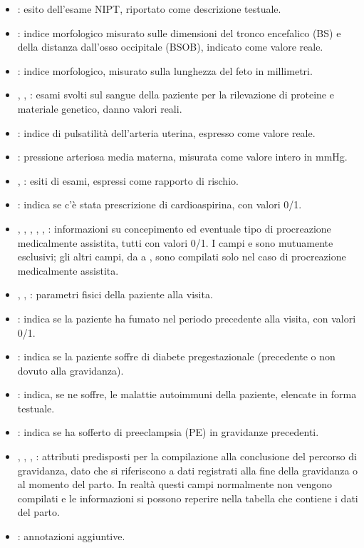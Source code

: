 \begin{itemize}
\item {}: esito dell'esame NIPT, riportato come descrizione testuale.
\item {}: indice morfologico misurato sulle dimensioni del tronco encefalico (BS) e della distanza dall'osso occipitale (BSOB), indicato come valore reale.
\item {}: indice morfologico, misurato sulla lunghezza del feto in millimetri.
\item {}, , : esami svolti sul sangue della paziente per la rilevazione di proteine e materiale genetico, danno valori reali.
\item {}: indice di pulsatilità dell'arteria uterina, espresso come valore reale.
\item {}: pressione arteriosa media materna, misurata come valore intero in mmHg.
\item {}, : esiti di esami, espressi come rapporto di rischio.
\item {}: indica se c'è stata prescrizione di cardioaspirina, con valori 0/1.
\item {}, , , , , : informazioni su concepimento ed eventuale tipo di procreazione medicalmente assistita, tutti con valori 0/1.
I campi  e  sono mutuamente esclusivi; gli altri campi, da  a , sono compilati solo nel caso di procreazione medicalmente assistita.
\item {}, , : parametri fisici della paziente alla visita.
\item {}: indica se la paziente ha fumato nel periodo precedente alla visita, con valori 0/1.
\item {}: indica se la paziente soffre di diabete pregestazionale (precedente o non dovuto alla gravidanza).
\item {}: indica, se ne soffre, le malattie autoimmuni della paziente, elencate in forma testuale.
\item {}: indica se ha sofferto di preeclampsia (PE) in gravidanze precedenti.
\item {}, , , : attributi predisposti per la compilazione alla conclusione del percorso di gravidanza, dato che si riferiscono a dati registrati alla fine della gravidanza o al momento del parto. In realtà questi campi normalmente non vengono compilati e le informazioni si possono reperire nella tabella che contiene i dati del parto.
\item {}: annotazioni aggiuntive.
\end{itemize}

